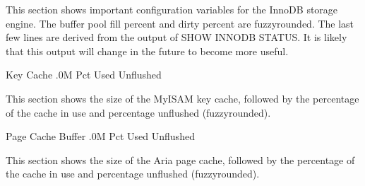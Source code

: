 \documentclass[letterpaper,10pt,english]{sphinxmanual}
\begin{document}
This section shows important configuration variables for the InnoDB storage
engine. The buffer pool fill percent and dirty percent are fuzzy\sphinxhyphen{}rounded. The
last few lines are derived from the output of SHOW INNODB STATUS. It is likely
that this output will change in the future to become more useful.

\begin{sphinxVerbatim}[commandchars=\\\{\}]
                Key Cache  .0M
                 Pct Used  \PYGZpc{}
                Unflushed  \PYGZpc{}
\end{sphinxVerbatim}

This section shows the size of the MyISAM key cache, followed by the percentage
of the cache in use and percentage unflushed (fuzzy\sphinxhyphen{}rounded).

\begin{sphinxVerbatim}[commandchars=\\\{\}]
        Page Cache Buffer  .0M
                 Pct Used  \PYGZpc{}
                Unflushed  \PYGZpc{}
\end{sphinxVerbatim}

This section shows the size of the Aria page cache, followed by the percentage
of the cache in use and percentage unflushed (fuzzy\sphinxhyphen{}rounded).
\end{document}
